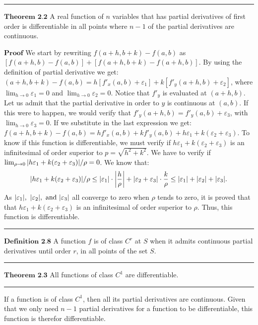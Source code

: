 \documentclass[0pt, a4paper]{article}
\begin{document}
\noindent\rule{\textwidth}{1pt}

$\textbf{Theorem 2.2}$ A real function of $n$ variables that has partial derivatives of first order is differentiable in all points where $n-1$ of the partial derivatives are continuous.

$\textbf{Proof}$ We start by rewriting $f(a+h,b+k)-f(a,b)$ as $\left[ f(a+h,b)-f(a,b) \right]+\left[ f(a+h,b+k)-f(a+h,b) \right]$. By using the definition of partial derivative we get: $(a+h,b+k)-f(a,b) = h\left[f'_x(a,b)+\varepsilon_1 \right] + k\left[f'_y(a+h,b)+\varepsilon_2\right]$, where $\lim_{h\to0}\varepsilon_1=0$ and $\lim_{h\to0}\varepsilon_2=0$. Notice that $f'_y$ is evaluated at $(a+h,b)$. Let us admit that the partial derivative in order to $y$ is continuous at $(a,b)$. If this were to happen, we would verify that $f'_y(a+h,b)=f'_y(a,b)+\varepsilon_3$, with $\lim_{h\to0}\varepsilon_3=0$. If we substitute in the last expression we get: $f(a+h,b+k)-f(a,b)=hf'_x(a,b)+kf'_y(a,b)+h\varepsilon_1+k(\varepsilon_2+\varepsilon_3)$. To know if this function is differentiable, we must verify if $h\varepsilon_1+k(\varepsilon_2+\varepsilon_3)$ is an infinitesimal of order superior to $p=\sqrt{h^2+k^2}$. We have to verify if $\lim_{\rho\to0}\abs{h\varepsilon_1+k(\varepsilon_2+\varepsilon_3)}/\rho=0$. We know that:
$$\abs{h\varepsilon_1+k(\varepsilon_2+\varepsilon_3)}/\rho\leq\abs{\varepsilon_1}\cdot\abs{\frac{h}{\rho}}+\abs{\varepsilon_2+\varepsilon_3}\cdot\frac{k}{\rho}\leq\abs{\varepsilon_1}+\abs{\varepsilon_2}+\abs{\varepsilon_3}.$$
As $\abs{\varepsilon_1},\ \abs{\varepsilon_2},\ \text{and }\abs{\varepsilon_3}$ all converge to zero when $\rho$ tends to zero, it is proved that that $h\varepsilon_1+k(\varepsilon_2+\varepsilon_3)$ is an infinitesimal of order superior to $\rho$. Thus, this function is differentiable.

\noindent\rule{\textwidth}{1pt}

$\textbf{Definition 2.8}$ A function $f$ is of class $C^r$ at $S$ when it admits continuous partial derivatives until order $r$, in all points of the set $S$.

\noindent\rule{\textwidth}{1pt}

$\textbf{Theorem 2.3}$ All functions of class $C^1$ are differentiable.

\noindent\rule{\textwidth}{1pt}

If a function is of class $C^1$, then all its partial derivatives are continuous. Given that we only need $n-1$ partial derivatives for a function to be differentiable, this function is therefor differentiable.
\end{document}
